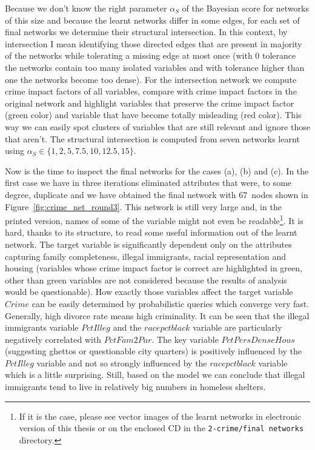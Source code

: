 \documentclass[english,cover]{fitthesis} %
\newcommand{\srccode}[1]{{\tt #1}}         %
\begin{document}
Because we don't know the right parameter $\alpha_S$ of the Bayesian score for networks of this size and because the learnt networks differ in some edges, for each set of final networks we determine their structural intersection. In this context, by intersection I mean identifying those directed edges that are present in majority of the networks while tolerating a missing edge at most once (with 0 tolerance the networks contain too many isolated variables and with tolerance higher than one the networks become too dense). For the intersection network we compute crime impact factors of all variables, compare with crime impact factors in the original network and highlight variables that preserve the crime impact factor (green color) and variable that have become totally misleading (red color). This way we can easily spot clusters of variables that are still relevant and ignore those that aren't. The structural intersection is computed from seven networks learnt using $\alpha_S \in \lbrace 1, 2, 5, 7.5, 10, 12.5, 15 \rbrace$.

\medskip
Now is the time to inspect the final networks for the cases (a), (b) and (c). In the first case we have in three iterations eliminated attributes that were, to some degree, duplicate and we have obtained the final network with 67~nodes shown in Figure~\ref{fig:crime_net_round3}. This network is still very large and, in the printed version, names of some of the variable might not even be readable\footnote{If it is the case, please see vector images of the learnt networks in electronic version of this thesis or on the enclosed CD in the \srccode{2-crime/final networks} directory.}. It is hard, thanks to its structure, to read some useful information out of the learnt network. The target variable is significantly dependent only on the attributes capturing family completeness, illegal immigrants, racial representation and housing (variables whose crime impact factor is correct are highlighted in green, other than green variables are not considered because the results of analysis would be questionable). How exactly those variables affect the target variable $Crime$ can be easily determined by probabilistic queries which converge very fast. Generally, high divorce rate means high criminality. It can be seen that the illegal immigrants variable $PctIlleg$ and the $racepctblack$ variable are particularly negatively correlated with $PctFam2Par$. The key variable $PctPersDenseHous$ (suggesting ghettos or questionable city quarters) is positively influenced by the $PctIlleg$ variable and not so strongly influenced by the $racepctblack$ variable which is a little surprising. Still, based on the model we can conclude that illegal immigrants tend to live in relatively big numbers in homeless shelters.
\end{document}
